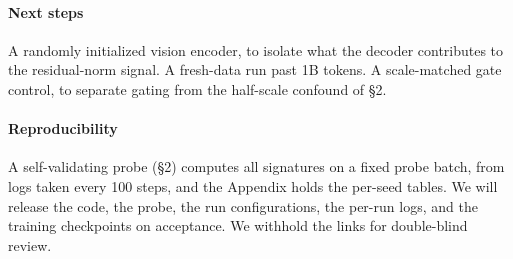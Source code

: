 \documentclass{article}
\begin{document}
\paragraph{Next steps} A randomly initialized vision encoder, to isolate what the decoder contributes to the residual-norm signal. A fresh-data run past 1B tokens. A scale-matched gate control, to separate gating from the half-scale confound of \S2.

\paragraph{Reproducibility} A self-validating probe (\S2) computes all signatures on a fixed probe batch, from logs taken every 100 steps, and the Appendix holds the per-seed tables. We will release the code, the probe, the run configurations, the per-run logs, and the training checkpoints on acceptance. We withhold the links for double-blind review.
\end{document}
